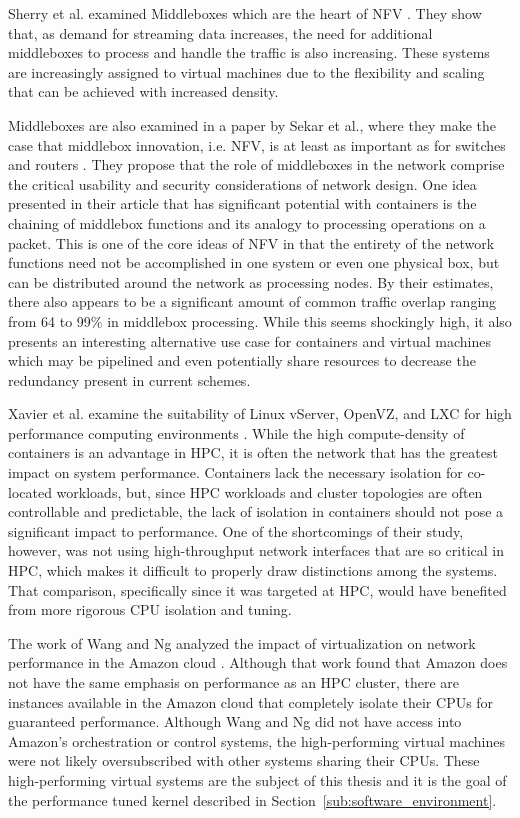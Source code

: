 Sherry et al. examined Middleboxes which are the heart of NFV \autocite{sherry2012making}.
They show that, as demand for streaming data increases, the need for additional middleboxes to process and handle the traffic is also increasing.
These systems are increasingly assigned to virtual machines due to the flexibility and scaling that can be achieved with increased density.

Middleboxes are also examined in a paper by Sekar et al., where they make the case that middlebox innovation, i.e. NFV, is at least as important as for switches and routers \autocite{sekar2011middlebox}.
They propose that the role of middleboxes in the network comprise the critical usability and security considerations of network design.
One idea presented in their article that has significant potential with containers is the chaining of middlebox functions and its analogy to processing operations on a packet.  
This is one of the core ideas of NFV in that the entirety of the network functions need not be accomplished in one system or even one physical box, but can be distributed around the network as processing nodes.  
By their estimates, there also appears to be a significant amount of common traffic overlap ranging from 64 to 99\% in middlebox processing. 
While this seems shockingly high, it also presents an interesting alternative use case for containers and virtual machines which may be pipelined and even potentially share resources to decrease the redundancy present in current schemes.

Xavier et al. examine the suitability of Linux vServer, OpenVZ, and LXC for high performance computing environments \autocite{xavier2013performance}.
While the high compute-density of containers is an advantage in HPC, it is often the network that has the greatest impact on system performance.
Containers lack the necessary isolation for co-located workloads, but, since HPC workloads and cluster topologies are often controllable and predictable, the lack of isolation in containers should not pose a significant impact to performance.
One of the shortcomings of their study, however, was not using high-throughput network interfaces that are so critical in HPC, which makes it difficult to properly draw distinctions among the systems.
That comparison, specifically since it was targeted at HPC, would have benefited from more rigorous CPU isolation and tuning.  

The work of Wang and Ng analyzed the impact of virtualization on network performance in the Amazon cloud \autocite{wangAmazon2010}.
Although that work found that Amazon does not have the same emphasis on performance as an HPC cluster, there are instances available in the Amazon cloud that completely isolate their CPUs for guaranteed performance.  
Although Wang and Ng did not have access into Amazon's orchestration or control systems, the high-performing virtual machines were not likely oversubscribed with other systems sharing their CPUs. 
These high-performing virtual systems are the subject of this thesis and it is the goal of the performance tuned kernel described in Section~\ref{sub:software_environment}.  

